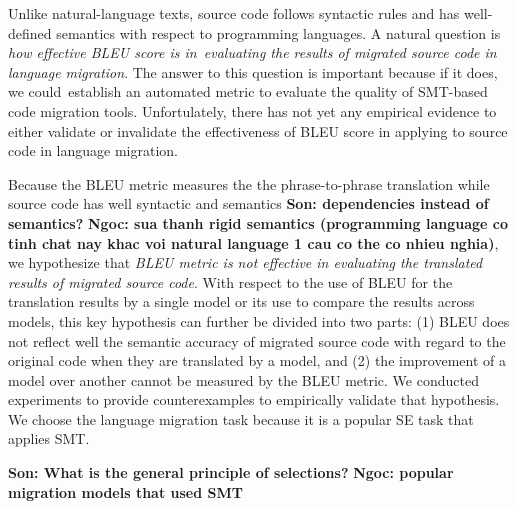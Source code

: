 Unlike natural-language texts, source code follows syntactic rules and
has well-defined semantics with respect to programming languages. A
natural question is {\em how effective BLEU score is in~evaluating the
  results of migrated source code in language migration}. The answer
to this question is important because if it does, we could~establish
an automated metric to evaluate the quality of SMT-based code
migration tools. 
Unfortulately, there has not yet
any empirical evidence to either validate or invalidate the
effectiveness of BLEU score in applying to source code in language
migration.

Because the BLEU metric measures the the phrase-to-phrase translation
while source code has well syntactic and semantics \textbf{Son: dependencies instead of semantics?}
\textbf{Ngoc: sua thanh rigid semantics (programming language co tinh chat nay khac voi natural language 1 cau co the co nhieu nghia)}, we hypothesize
that {\em BLEU metric is not effective in evaluating the translated
  results of migrated source code}. With respect to the use of BLEU
for the translation results by a single model or its use to compare
the results across models, this key hypothesis can further be divided
into two parts: (1) BLEU does not reflect well the semantic accuracy
of migrated source code with regard to the original code when they are
translated by a model, and (2) the improvement of a model over another
cannot be measured by the BLEU metric.
%
We conducted experiments to provide counterexamples to empirically
validate that hypothesis. We choose the language migration task
because it is a popular SE task that applies SMT. 

\textbf{Son: What is the general principle of selections?}
\textbf{Ngoc: popular migration models that used SMT}

